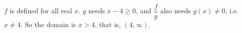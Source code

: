 $f$ is defined for all real $x$. $g$ needs $x-4\ge0$, and $\dfrac{f}{g}$ also needs $g(x)\ne0$, i.e. $x\ne4$. So the domain is $x>4$, that is, $\boxed{(4,\infty)}$.
